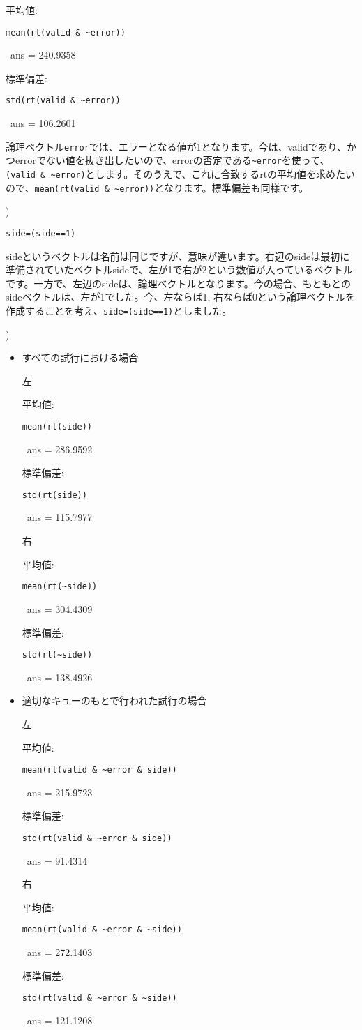 \documentclass{jsarticle}
\begin{document}
平均値: {\tt mean(rt(valid \& \verb|~error|)) 

\ ans = 240.9358}

標準偏差: {\tt std(rt(valid \& \verb|~error|)) 

\ ans = 106.2601}

\begin{screen}
論理ベクトル{\tt error}では、エラーとなる値が1となります。今は、validであり、かつerrorでない値を抜き出したいので、errorの否定である{\tt \verb|~error|}を使って、{\tt (valid \& \verb|~error|)}とします。そのうえで、これに合致するrtの平均値を求めたいので、{\tt mean(rt(valid \& \verb|~error|))}となります。標準偏差も同様です。
\end{screen}

\bigskip

)

{\tt side=(side==1)}

\begin{screen}
sideというベクトルは名前は同じですが、意味が違います。右辺のsideは最初に準備されていたベクトルsideで、左が1で右が2という数値が入っているベクトルです。一方で、左辺のsideは、論理ベクトルとなります。今の場合、もともとのsideベクトルは、左が1でした。今、左ならば1, 右ならば0という論理ベクトルを作成することを考え、{\tt side=(side==1)}としました。
\end{screen}

\bigskip

)

\begin{itemize}
\item すべての試行における場合

左

平均値: {\tt mean(rt(side)) 

\ ans = 286.9592}

標準偏差: {\tt std(rt(side)) 

\ ans = 115.7977}

右

平均値: {\tt mean(rt(\verb|~side|)) 

\ ans = 304.4309}

標準偏差: {\tt std(rt(\verb|~side|)) 

\ ans = 138.4926}

\bigskip

\item 適切なキューのもとで行われた試行の場合

左

平均値: {\tt mean(rt(valid \& \verb|~error| \& side))

\ ans = 215.9723}

標準偏差: {\tt std(rt(valid \& \verb|~error| \& side)) 

\ ans = 91.4314}

右

平均値: {\tt mean(rt(valid \& \verb|~error| \& \verb|~side|)) 

\ ans = 272.1403}

標準偏差: {\tt std(rt(valid \& \verb|~error| \& \verb|~side|)) 

\ ans = 121.1208}

\end{itemize}
\end{document}

